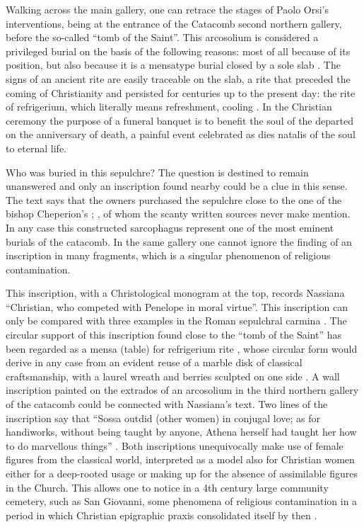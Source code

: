 \documentclass[amsthm,ebook]{saparticle}
\begin{document}
\noindent Walking across the main gallery, one can retrace the stages of Paolo Orsi’s interventions, being at the entrance of the Catacomb second northern gallery, before the so-called ``tomb of the Saint''. This arcosolium is considered a privileged burial on the basis of the following reasons: most of all because of its position, but also because it is a mensatype burial closed by a sole slab \citep[292-294]{ORSI1893}. The signs of an ancient rite are easily traceable on the slab, a rite that preceded the coming of Christianity and persisted for centuries up to the present day: the rite of refrigerium, which literally means refreshment, cooling \citep{GIUNTELLA1985}. In the Christian ceremony the purpose of a funeral banquet is to benefit the soul of the departed on the anniversary of death, a painful event celebrated as dies natalis of the soul to eternal life.

Who was buried in this sepulchre? The question is destined to remain unanswered and only an inscription found nearby could be a clue in this sense. The text says that the owners purchased the sepulchre close to the one of the bishop Cheperion’s \citep[507-508]{ORSI1895}; \citep[55-58]{RIZZONE2011}, of whom the scanty written sources never make mention. In any case this constructed sarcophagus represent one of the most eminent burials of the catacomb. In the same gallery one cannot ignore the finding of an inscription in many fragments, which is a singular phenomenon of religious contamination.

This inscription, with a Christological monogram at the top, records Nassiana ``Christian, who competed with Penelope in moral virtue''. This inscription can only be compared with three examples in the Roman sepulchral carmina \citep{CLE}. The circular support of this inscription found close to the ``tomb of the Saint'' has been regarded as a mensa (table) for refrigerium rite \citep[47]{GIUNTELLA1985}, whose circular form would derive in any case from an evident reuse of a marble disk of classical craftsmanship, with a laurel wreath and berries sculpted on one side \citep[n. 234]{ORSI1895}. A wall inscription painted on the extrados of an arcosolium in the third northern gallery of the catacomb could be connected with Nassiana’s text. Two lines of the inscription say that ``Sossa outdid (other women) in conjugal love; as for handiworks, without being taught by anyone, Athena herself had taught her how to do marvellous things'' \citep[n. 3]{FERRUA1940}. Both inscriptions unequivocally make use of female figures from the classical world, interpreted as a model also for Christian women either for a deep-rooted usage or making up for the absence of assimilable figures in the Church. This allows one to notice in a 4th century large community cemetery, such as San Giovanni, some phenomena of religious contamination in a period in which Christian epigraphic praxis consolidated itself by then \citep[484]{SGARLATA1999}.
\end{document}
